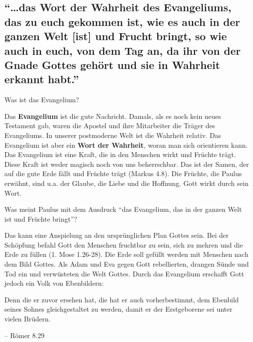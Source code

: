 \documentclass[
  12pt,
]{krantz}
\makeatletter
\newenvironment{kframe}{%
\medskip{}
\setlength{\fboxsep}{.8em}
 \def\at@end@of@kframe{}%
 \ifinner\ifhmode%
  \def\at@end@of@kframe{\end{minipage}}%
  \begin{minipage}{\columnwidth}%
 \fi\fi%
 \def\FrameCommand##1{\hskip\@totalleftmargin \hskip-\fboxsep
 \colorbox{shadecolor}{##1}\hskip-\fboxsep
     \hskip-\linewidth \hskip-\@totalleftmargin \hskip\columnwidth}%
 \MakeFramed {\advance\hsize-\width
   \@totalleftmargin\z@ \linewidth\hsize
   \@setminipage}}%
 {\par\unskip\endMakeFramed%
 \at@end@of@kframe}
\newenvironment{rmdblock}[1]
  {
  \begin{itemize}
  \renewcommand{\labelitemi}{
    \raisebox{-.7\height}[0pt][0pt]{
      {\setkeys{Gin}{width=3em,keepaspectratio}\texttt{[image: img/\#1]}}
    }
  }
  \setlength{\fboxsep}{1em}
  \begin{kframe}
  \item
  }
  {
  \end{kframe}
  \end{itemize}
  }
\newenvironment{rmdquote}
  {\begin{rmdblock}{quote}}
  {\end{rmdblock}}
\makeatother
\begin{document}
\hypertarget{das-wort-der-wahrheit-des-evangeliums-das-zu-euch-gekommen-ist-wie-es-auch-in-der-ganzen-welt-ist-und-frucht-bringt-so-wie-auch-in-euch-von-dem-tag-an-da-ihr-von-der-gnade-gottes-gehuxf6rt-und-sie-in-wahrheit-erkannt-habt.}{%
\subsection{``\ldots das Wort der Wahrheit des Evangeliums, das zu euch gekommen ist, wie es auch in der ganzen Welt {[}ist{]} und Frucht bringt, so wie auch in euch, von dem Tag an, da ihr von der Gnade Gottes gehört und sie in Wahrheit erkannt habt.''}\label{das-wort-der-wahrheit-des-evangeliums-das-zu-euch-gekommen-ist-wie-es-auch-in-der-ganzen-welt-ist-und-frucht-bringt-so-wie-auch-in-euch-von-dem-tag-an-da-ihr-von-der-gnade-gottes-gehuxf6rt-und-sie-in-wahrheit-erkannt-habt.}}

Was ist das Evangelium?

Das \textbf{Evangelium} ist die gute Nachricht. Damals, als es noch kein neues Testament gab, waren die Apostel und ihre Mitarbeiter die Träger des Evangeliums.
In unserer postmoderne Welt ist die Wahrheit relativ. Das Evangelium ist aber ein \textbf{Wort der Wahrheit}, woran man sich orientieren kann.
Das Evangelium ist eine Kraft, die in den Menschen wirkt und Früchte trägt. Diese Kraft ist weder magisch noch von uns beherrschbar. Das ist der Samen, der auf die gute Erde fällt und Früchte trägt (Markus 4.8). Die Früchte, die Paulus erwähnt, sind u.a. der Glaube, die Liebe und die Hoffnung. Gott wirkt durch sein Wort.

Was meint Paulus mit dem Ausdruck ``das Evangelium, das in der ganzen Welt ist und Früchte bringt''?

Das kann eine Anspielung an den ursprünglichen Plan Gottes sein. Bei der Schöpfung befahl Gott den Menschen fruchtbar zu sein, sich zu mehren und die Erde zu füllen (1. Mose 1.26-28). Die Erde soll gefüllt werden mit Menschen nach dem Bild Gottes. Als Adam und Eva gegen Gott rebellierten, drangen Sünde und Tod ein und verwüsteten die Welt Gottes. Durch das Evangelium erschafft Gott jedoch ein Volk von Ebenbildern:

\begin{rmdquote}
Denn die er zuvor ersehen hat, die hat er auch vorherbestimmt, dem
Ebenbild seines Sohnes gleichgestaltet zu werden, damit er der
Erstgeborene sei unter vielen Brüdern.

-- Römer 8.29
\end{rmdquote}
\end{document}
